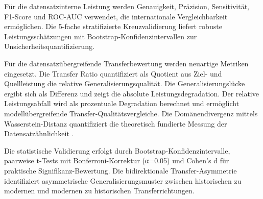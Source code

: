 \documentclass[11pt,a4paper]{article}
\begin{document}

    Für die datensatzinterne Leistung werden Genauigkeit, Präzision, Sensitivität, F1-Score und ROC-AUC verwendet, die internationale Vergleichbarkeit ermöglichen. Die 5-fache stratifizierte Kreuzvalidierung liefert robuste Leistungsschätzungen mit Bootstrap-Konfidenzintervallen zur Unsicherheitsquantifizierung.

    Für die datensatzübergreifende Transferbewertung werden neuartige Metriken eingesetzt. Die Transfer Ratio quantifiziert als Quotient aus Ziel- und Quellleistung die relative Generalisierungsqualität. Die Generalisierungslücke ergibt sich als Differenz und zeigt die absolute Leistungsdegradation. Der relative Leistungsabfall wird als prozentuale Degradation berechnet und ermöglicht modellübergreifende Transfer-Qualitätsvergleiche. Die Domänendivergenz mittels Wasserstein-Distanz quantifiziert die theoretisch fundierte Messung der Datensatzähnlichkeit \parencite{Mourouzis2021}.

    Die statistische Validierung erfolgt durch Bootstrap-Konfidenzintervalle, paarweise t-Tests mit Bonferroni-Korrektur (α=0.05) und Cohen's d für praktische Signifikanz-Bewertung. Die bidirektionale Transfer-Asymmetrie identifiziert asymmetrische Generalisierungsmuster zwischen historischen zu modernen und modernen zu historischen Transferrichtungen.
\end{document}
